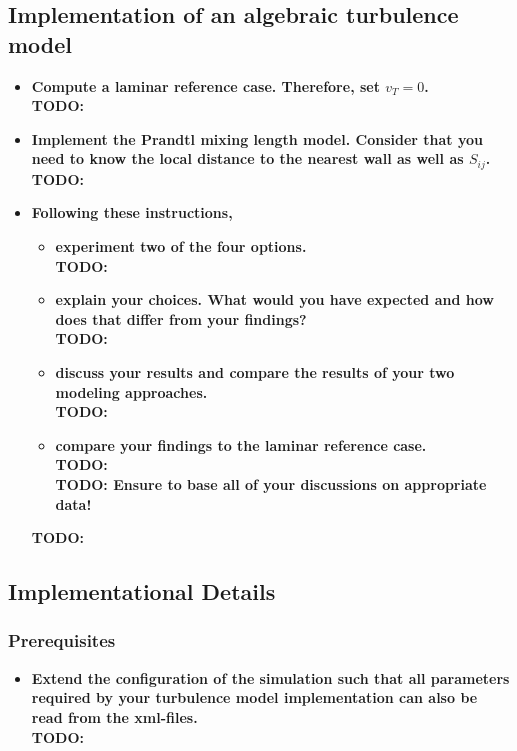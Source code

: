 \documentclass[a4paper]{article}
\newcommand{\td}[1]{
	\textbf{\color{red}TODO: {#1}}
}
\begin{document}
\subsection{Implementation of an algebraic turbulence model}
\begin{itemize}
	\item \textbf{Compute a laminar reference case. Therefore, set $v_T = 0$.}\\
	\td{}
	\item \textbf{Implement the Prandtl mixing length model. Consider that you need to know the local distance to the nearest wall as well as $S_{ij}$.}\\
	\td{}
	\item \textbf{Following these instructions,}
	\begin{itemize}
		\item \textbf{experiment two of the four options.}\\
		\td{}
		\item \textbf{explain your choices. What would you have expected and how does that differ from your findings?}\\
		\td{}
		\item \textbf{discuss your results and compare the results of your two modeling approaches.}\\
		\td{}
		\item \textbf{compare your findings to the laminar reference case.}\\
		\td{}\\
		\td{Ensure to base all of your discussions on appropriate data!}
	\end{itemize}
	\td{}\\
\end{itemize}
\subsection{Implementational Details}
\subsubsection{Prerequisites}
	\begin{itemize}
	\item \textbf{Extend the configuration of the simulation such that all parameters required by your turbulence model implementation can also be read from the xml-files.}\\
	\td{}
\end{itemize}
\end{document}
